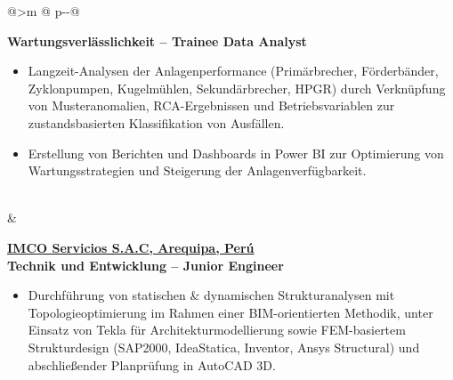 \begin{tabular}{@{}>{\raggedleft\arraybackslash}m{\datecol} @{\hspace{\colgap}} p{\dimexpr\textwidth-\datecol-\colgap\relax}@{}}
\begin{minipage}[t]{\linewidth}
\begin{expblock}
  \textbf{Wartungsverlässlichkeit – Trainee Data Analyst}\\[-1em]
  \begin{itemize}[nosep,leftmargin=1em]
      \item Langzeit-Analysen der Anlagenperformance (Primärbrecher, Förderbänder, Zyklonpumpen, Kugelmühlen, Sekundärbrecher, HPGR) durch Verknüpfung von Musteranomalien, RCA-Ergebnissen und Betriebsvariablen zur zustandsbasierten Klassifikation von Ausfällen.
  \item Erstellung von Berichten und Dashboards in Power BI zur Optimierung von Wartungsstrategien und Steigerung der Anlagenverfügbarkeit.
  \end{itemize}
\end{expblock}
\end{minipage}
\\[-0.2em]

 &
\begin{minipage}[t]{\linewidth}\vspace{0pt}
\begin{expblock}
  \footnotesize
  \setlength{\parindent}{0pt}\setlength{\parskip}{0pt}
  \textbf{\href{https://www.linkedin.com/company/imco-servicios-s-a-c/posts/?feedView=all}{IMCO Servicios S.A.C, Arequipa, Perú}}\\[-0.1em]
  \textbf{Technik und Entwicklung – Junior Engineer}\\[-1em]
  \begin{itemize}[nosep,leftmargin=1em]
    \item Durchführung von statischen \& dynamischen Strukturanalysen mit Topologieoptimierung im Rahmen einer BIM-orientierten Methodik, unter Einsatz von Tekla für Architekturmodellierung sowie FEM-basiertem Strukturdesign (SAP2000, IdeaStatica, Inventor, Ansys Structural) und abschließender Planprüfung in AutoCAD 3D.
  \end{itemize}
\end{expblock}
\end{minipage}

\\[-1.5em]


\end{tabular}
